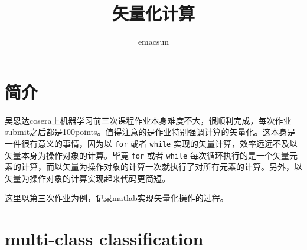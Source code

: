 \documentclass[10pt,a4paper,UTF8]{article}
\author{emacsun}
\date{}
\title{矢量化计算}
\begin{document}
\maketitle
\tableofcontents
{}
\section{简介}
\label{sec:org43fc00d}


吴恩达cosera上机器学习前三次课程作业本身难度不大，很顺利完成，每次作业submit之后都是100points。值得注意的是作业特别强调计算的矢量化。这本身是一件很有意义的事情，因为以 \texttt{for} 或者 \texttt{while} 实现的矢量计算，效率远远不及以矢量本身为操作对象的计算。毕竟 \texttt{for} 或者 \texttt{while} 每次循环执行的是一个矢量元素的计算，而以矢量为操作对象的计算一次就执行了对所有元素的计算。另外，以矢量为操作对象的计算实现起来代码更简短。

这里以第三次作业为例，记录matlab实现矢量化操作的过程。

\section{multi-class classification}
\label{sec:org1a1097b}
\end{document}
